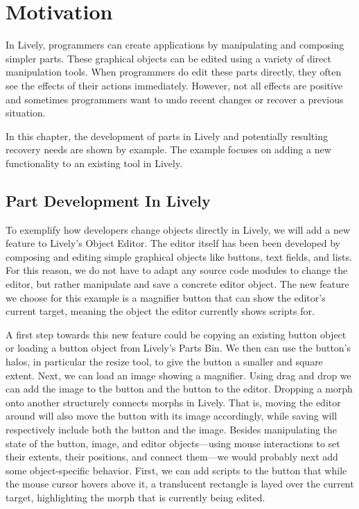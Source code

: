 \chapter{Motivation} \label{chapter:MOTIVATION}

In Lively, programmers can create applications by manipulating and composing simpler parts.
These graphical objects can be edited using a variety of direct manipulation tools.
When programmers do edit these parts directly, they often see the effects of their actions immediately.
However, not all effects are positive and sometimes programmers want to undo recent changes or recover a previous situation.

In this chapter, the development of parts in Lively and potentially resulting recovery needs are shown by example.
The example focuses on adding a new functionality to an existing tool in Lively.



\section{Part Development In Lively}

To exemplify how developers change objects directly in Lively, we will add a new feature to Lively's Object Editor.
The editor itself has been been developed by composing and editing simple graphical objects like buttons, text fields, and lists.
For this reason, we do not have to adapt any source code modules to change the editor, but rather manipulate and save a concrete editor object.
The new feature we choose for this example is a magnifier button that can show the editor's current target, meaning the object the editor currently shows scripts for.

A first step towards this new feature could be copying an existing button object or loading a button object from Lively's Parts Bin.
We then can use the button's halos, in particular the resize tool, to give the button a smaller and square extent.
Next, we can load an image showing a magnifier.
Using drag and drop we can add the image to the button and the button to the editor.
Dropping a morph onto another structurely connects morphs in Lively.
That is, moving the editor around will also move the button with its image accordingly, while saving will respectively include both the button and the image.
Besides manipulating the state of the button, image, and editor objects---using mouse interactions to set their extents, their positions, and connect them---we would probably next add some object-specific behavior.
First, we can add scripts to the button that while the mouse cursor hovers above it, a translucent rectangle is layed over the current target, highlighting the morph that is currently being edited.

